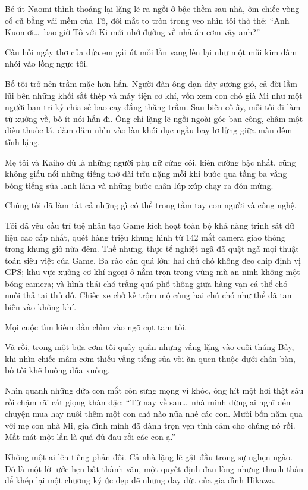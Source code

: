 \documentclass[../main.tex]{subfiles}
\begin{document}
Bé út Naomi thỉnh thoảng lại lặng lẽ ra ngồi ở bậc thềm sau nhà, ôm chiếc vòng cổ cũ bằng vải mềm của Tô, đôi mắt to tròn trong veo nhìn tôi thỏ thẻ: ``Anh Kuon ơi\dots\ bao giờ Tô với Ki mới nhớ đường về nhà ăn cơm vậy anh?''

Câu hỏi ngây thơ của đứa em gái út mỗi lần vang lên lại như một mũi kim đâm nhói vào lồng ngực tôi.

Bố tôi trở nên trầm mặc hơn hẳn. Người đàn ông dạn dày sương gió, cả đời lầm lũi bên những khối sắt thép và máy tiện cơ khí, vốn xem con chó già Mi như một người bạn tri kỷ chia sẻ bao cay đắng thăng trầm. Sau biến cố ấy, mỗi tối đi làm từ xưởng về, bố ít nói hẳn đi. Ông chỉ lặng lẽ ngồi ngoài góc ban công, châm một điếu thuốc lá, đăm đăm nhìn vào làn khói đục ngầu bay lơ lửng giữa màn đêm tĩnh lặng.

Mẹ tôi và Kaiho dù là những người phụ nữ cứng cỏi, kiên cường bậc nhất, cũng không giấu nổi những tiếng thở dài trĩu nặng mỗi khi bước qua tầng ba vắng bóng tiếng sủa lanh lảnh và những bước chân lúp xúp chạy ra đón mừng.

Chúng tôi đã làm tất cả những gì có thể trong tầm tay con người và công nghệ.

Tôi đã yêu cầu trí tuệ nhân tạo Game kích hoạt toàn bộ khả năng trinh sát dữ liệu cao cấp nhất, quét hàng triệu khung hình từ 142 mắt camera giao thông trong khung giờ nửa đêm. Thế nhưng, thực tế nghiệt ngã đã quật ngã mọi thuật toán siêu việt của Game. Ba rào cản quá lớn: hai chú chó không đeo chip định vị GPS; khu vực xưởng cơ khí ngoại ô nằm trọn trong vùng mù an ninh không một bóng camera; và hình thái chó trắng quá phổ thông giữa hàng vạn cá thể chó nuôi thả tại thủ đô. Chiếc xe chở kẻ trộm mộ cùng hai chú chó như thể đã tan biến vào không khí.

Mọi cuộc tìm kiếm dần chìm vào ngõ cụt tăm tối.

Và rồi, trong một bữa cơm tối quây quần nhưng vắng lặng vào cuối tháng Bảy, khi nhìn chiếc mâm cơm thiếu vắng tiếng sủa vòi ăn quen thuộc dưới chân bàn, bố tôi khẽ buông đũa xuống.

Nhìn quanh những đứa con mắt còn sưng mọng vì khóc, ông hít một hơi thật sâu rồi chậm rãi cất giọng khàn đặc: ``Từ nay về sau\dots\ nhà mình đừng ai nghĩ đến chuyện mua hay nuôi thêm một con chó nào nữa nhé các con. Mười bốn năm qua với mẹ con nhà Mi, gia đình mình đã dành trọn vẹn tình cảm cho chúng nó rồi. Mất mát một lần là quá đủ đau rồi các con ạ.''

Không một ai lên tiếng phản đối. Cả nhà lặng lẽ gật đầu trong sự nghẹn ngào. Đó là một lời ước hẹn bất thành văn, một quyết định đau lòng nhưng thanh thản để khép lại một chương ký ức đẹp đẽ nhưng day dứt của gia đình Hikawa.
\end{document}
